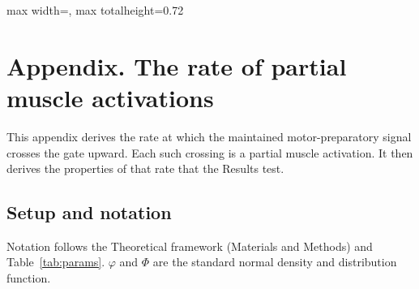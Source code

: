 \documentclass[a4paper,11pt]{article}
\theoremstyle{definition}
\newcommand{\1}{\mathbbm{1}}
\begin{document}
\begin{landscape}
\label{tab:comparison}

\begin{center}\footnotesize
\begin{adjustbox}{max width=\linewidth, max totalheight=0.72\textheight}

\end{adjustbox}
\end{center}
\end{landscape}

\section{Appendix. The rate of partial muscle activations}

This appendix derives the rate at which the maintained motor-preparatory signal crosses the gate upward. Each such crossing is a partial muscle activation. It then derives the properties of that rate that the Results test.

\subsection{Setup and notation}

Notation follows the Theoretical framework (Materials and Methods) and Table~\ref{tab:params}. $\varphi$ and $\Phi$ are the standard normal density and distribution function.
\end{document}
